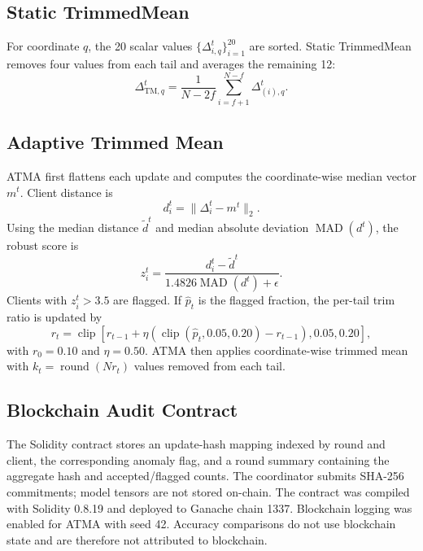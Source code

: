 \documentclass[10pt,letterpaper]{article}
\begin{document}
\subsection{Static TrimmedMean}

For coordinate $q$, the 20 scalar values
$\{\Delta_{i,q}^t\}_{i=1}^{20}$ are sorted. Static TrimmedMean removes four
values from each tail and averages the remaining 12:
\begin{equation}
\Delta_{\mathrm{TM},q}^t=
\frac{1}{N-2f}\sum_{i=f+1}^{N-f}\Delta_{(i),q}^t.
\end{equation}

\subsection{Adaptive Trimmed Mean}

ATMA first flattens each update and computes the coordinate-wise median vector
$m^t$. Client distance is
\begin{equation}
d_i^t=\|\Delta_i^t-m^t\|_2.
\end{equation}
Using the median distance $\widetilde d^t$ and median absolute deviation
$\operatorname{MAD}(d^t)$, the robust score is
\begin{equation}
z_i^t =
\frac{d_i^t-\widetilde d^t}
{1.4826\operatorname{MAD}(d^t)+\epsilon}.
\end{equation}
Clients with $z_i^t>3.5$ are flagged. If $\widehat p_t$ is the flagged fraction,
the per-tail trim ratio is updated by
\begin{equation}
r_t=\operatorname{clip}\left[
r_{t-1}+\eta\left(
\operatorname{clip}(\widehat p_t,0.05,0.20)-r_{t-1}
\right),0.05,0.20\right],
\end{equation}
with $r_0=0.10$ and $\eta=0.50$. ATMA then applies coordinate-wise trimmed mean
with $k_t=\operatorname{round}(Nr_t)$ values removed from each tail.

\subsection{Blockchain Audit Contract}

The Solidity contract stores an update-hash mapping indexed by round and
client, the corresponding anomaly flag, and a
round summary containing the aggregate hash and accepted/flagged counts. The
coordinator submits SHA-256 commitments; model tensors are not stored on-chain.
The contract was compiled with Solidity 0.8.19 and deployed to Ganache chain
1337. Blockchain logging was enabled for ATMA with seed 42. Accuracy comparisons
do not use blockchain state and are therefore not attributed to blockchain.
\end{document}
